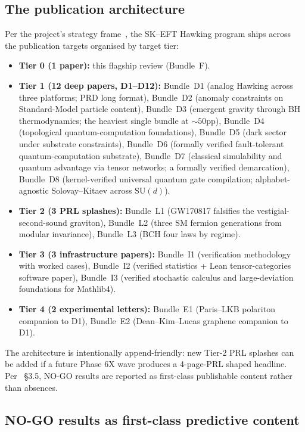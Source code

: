 \documentclass[aps,prd,reprint,nofootinbib,superscriptaddress]{revtex4-2}
\begin{document}
\subsection{The publication architecture}

Per the project's strategy frame~\cite{Roehm2026Strategy}, the SK--EFT
Hawking program ships across the publication targets organised by
target tier:

\begin{itemize}
\item \textbf{Tier 0 (1 paper):} this flagship review (Bundle~F).
\item \textbf{Tier 1 (12 deep papers, D1--D12):} Bundle~D1 (analog Hawking
  across three platforms; PRD long format), Bundle~D2 (anomaly
  constraints on Standard-Model particle content), Bundle~D3 (emergent
  gravity through BH thermodynamics; the heaviest single bundle at
  $\sim 50$pp), Bundle~D4 (topological quantum-computation foundations),
  Bundle~D5 (dark sector under substrate constraints), Bundle~D6
  (formally verified fault-tolerant quantum-computation substrate),
  Bundle~D7 (classical simulability and quantum advantage via tensor
  networks; a formally verified demarcation), Bundle~D8
  (kernel-verified universal quantum gate compilation;
  alphabet-agnostic Solovay--Kitaev across $\mathrm{SU}(d)$).
\item \textbf{Tier 2 (3 PRL splashes):} Bundle~L1 (GW170817 falsifies
  the vestigial-second-sound graviton), Bundle~L2 (three SM fermion
  generations from modular invariance), Bundle~L3 (BCH four laws by
  regime).
\item \textbf{Tier 3 (3 infrastructure papers):} Bundle~I1 (verification
  methodology with worked cases), Bundle~I2 (verified statistics +
  Lean tensor-categories software paper), Bundle~I3 (verified
  stochastic calculus and large-deviation foundations for Mathlib4).
\item \textbf{Tier 4 (2 experimental letters):} Bundle~E1 (Paris--LKB
  polariton companion to D1), Bundle~E2 (Dean--Kim--Lucas graphene
  companion to D1).
\end{itemize}

The architecture is intentionally append-friendly: new Tier-2 PRL
splashes can be added if a future Phase 6X wave produces a 4-page-PRL
shaped headline. Per~\cite{Roehm2026Strategy} \S 3.5, NO-GO results
are reported as first-class publishable content rather than absences.

\subsection{NO-GO results as first-class predictive content}
\end{document}
